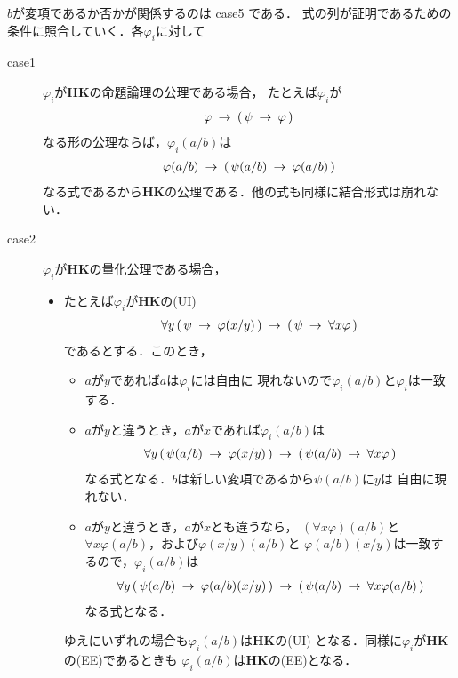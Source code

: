 	\begin{metaprf}
		$b$が変項であるか否かが関係するのは case5 である．
		式の列が証明であるための条件に照合していく．各$\varphi_{i}$に対して
		\begin{description}
			\item[case1] $\varphi_{i}$が{\bf HK}の命題論理の公理である場合，
				たとえば$\varphi_{i}$が
				\begin{align}
					\varphi \hspace{0.25em}\rightarrow\hspace{0.25em} (\, \psi \hspace{0.25em}\rightarrow\hspace{0.25em} \varphi\, )
				\end{align}
				なる形の公理ならば，$\varphi_{i}(a/b)$は
				\begin{align}
					\varphi(a/b) \hspace{0.25em}\rightarrow\hspace{0.25em} (\, \psi(a/b) \hspace{0.25em}\rightarrow\hspace{0.25em} \varphi(a/b)\, )
				\end{align}
				なる式であるから{\bf HK}の公理である．他の式も同様に結合形式は崩れない．
				
			\item[case2] $\varphi_{i}$が{\bf HK}の量化公理である場合，
				\begin{itemize}
					\item たとえば$\varphi_{i}$が{\bf HK}の(UI)
						\begin{align}
							\forall y\, (\, \psi \hspace{0.25em}\rightarrow\hspace{0.25em} \varphi(x/y)\, )
							\hspace{0.25em}\rightarrow\hspace{0.25em} (\, \psi \hspace{0.25em}\rightarrow\hspace{0.25em} \forall x \varphi\, )
						\end{align}
						であるとする．このとき，
						\begin{itemize}
							\item $a$が$y$であれば$a$は$\varphi_{i}$には自由に
								現れないので$\varphi_{i}(a/b)$と$\varphi_{i}$は一致する．
							\item $a$が$y$と違うとき，$a$が$x$であれば$\varphi_{i}(a/b)$は
								\begin{align}
									\forall y\, (\, \psi(a/b) \hspace{0.25em}\rightarrow\hspace{0.25em} \varphi(x/y)\, )
									\hspace{0.25em}\rightarrow\hspace{0.25em} (\, \psi(a/b) \hspace{0.25em}\rightarrow\hspace{0.25em} \forall x \varphi\, )
								\end{align}
								なる式となる．$b$は新しい変項であるから$\psi(a/b)$に$y$は
								自由に現れない．
							\item $a$が$y$と違うとき，$a$が$x$とも違うなら，
								$(\forall x \varphi)(a/b)$と
								$\forall x \varphi(a/b)$，および$\varphi(x/y)(a/b)$と
								$\varphi(a/b)(x/y)$は一致するので，$\varphi_{i}(a/b)$は
								\begin{align}
									\forall y\, (\, \psi(a/b) \hspace{0.25em}\rightarrow\hspace{0.25em} \varphi(a/b)(x/y)\, )
									\hspace{0.25em}\rightarrow\hspace{0.25em} (\, \psi(a/b) \hspace{0.25em}\rightarrow\hspace{0.25em} \forall x \varphi(a/b)\, )
								\end{align}
								なる式となる．
						\end{itemize}
						ゆえにいずれの場合も$\varphi_{i}(a/b)$は{\bf HK}の(UI)
						となる．同様に$\varphi_{i}$が{\bf HK}の(EE)であるときも
						$\varphi_{i}(a/b)$は{\bf HK}の(EE)となる．
				

\end{itemize}
\end{description}
\end{metaprf}
